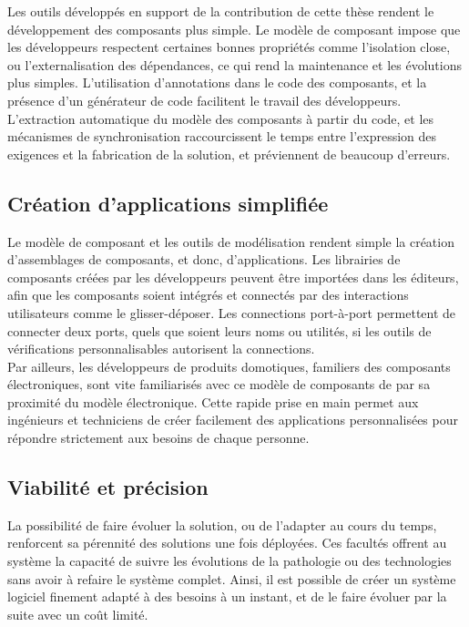 Les outils développés en support de la contribution de cette thèse rendent le développement des composants plus simple. Le modèle de composant impose que les développeurs respectent certaines bonnes propriétés comme l'isolation close, ou l'externalisation des dépendances, ce qui rend la maintenance et les évolutions plus simples. L'utilisation d'annotations dans le code des composants, et la présence d'un générateur de code facilitent le travail des développeurs. L'extraction automatique du modèle des composants à partir du code, et les mécanismes de synchronisation raccourcissent le temps entre l'expression des exigences et la fabrication de la solution, et préviennent de beaucoup d'erreurs.


\subsection{Création d'applications simplifiée}
Le modèle de composant et les outils de modélisation rendent simple la création d'assemblages de composants, et donc, d'applications. Les librairies de composants créées par les développeurs peuvent être importées dans les éditeurs, afin que les composants soient intégrés et connectés par des interactions utilisateurs comme le glisser-déposer. Les connections port-à-port permettent de connecter deux ports, quels que soient leurs noms ou utilités, si les outils de vérifications personnalisables autorisent la connections.\\
Par ailleurs, les développeurs de produits domotiques, familiers des composants électroniques, sont vite familiarisés avec ce modèle de composants de par sa proximité du modèle électronique. Cette rapide prise en main permet aux ingénieurs et techniciens de créer facilement des applications personnalisées pour répondre strictement aux besoins de chaque personne.

\subsection{Viabilité et précision}
La possibilité de faire évoluer la solution, ou de l'adapter au cours du temps, renforcent sa pérennité des solutions une fois déployées. Ces facultés offrent au système la capacité de suivre les évolutions de la pathologie ou des technologies sans avoir à refaire le système complet. Ainsi, il est possible de créer un système logiciel finement adapté à des besoins à un instant, et de le faire évoluer par la suite avec un coût limité.

